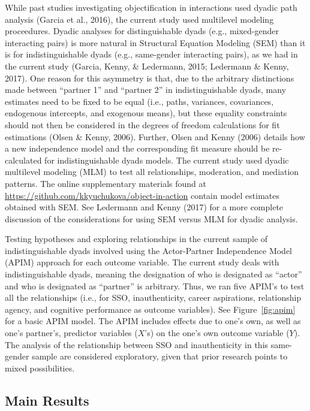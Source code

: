 \documentclass[man]{apa6}
\begin{document}
While past studies investigating objectification in interactions used
dyadic path analysis (Garcia et al., 2016), the current study used
multilevel modeling proceedures. Dyadic analyses for distinguishable
dyads (e.g., mixed-gender interacting pairs) is more natural in
Structural Equation Modeling (SEM) than it is for indistinguishable
dyads (e.g., same-gender interacting pairs), as we had in the current
study (Garcia, Kenny, \& Ledermann, 2015; Ledermann \& Kenny, 2017). One
reason for this asymmetry is that, due to the arbitrary distinctions
made between \enquote{partner 1} and \enquote{partner 2} in
indistinguishable dyads, many estimates need to be fixed to be equal
(i.e., paths, variances, covariances, endogenous intercepts, and
exogenous means), but these equality constraints should not then be
considered in the degrees of freedom calculations for fit estimations
(Olsen \& Kenny, 2006). Further, Olsen and Kenny (2006) details how a
new independence model and the corresponding fit measure should be
re-calculated for indistinguishable dyads models. The current study used
dyadic multilevel modeling (MLM) to test all relationships, moderation,
and mediation patterns. The online supplementary materials found at
\url{https://github.com/kkyuchukova/object-in-action} contain model
estimates obtained with SEM. See Ledermann and Kenny (2017) for a more
complete discussion of the considerations for using SEM versus MLM for
dyadic analysis.

Testing hypotheses and exploring relationships in the current sample of
indistinguishable dyads involved using the Actor-Partner Independence
Model (APIM) approach for each outcome variable. The current study deals
with indistinguishable dyads, meaning the designation of who is
designated as \enquote{actor} and who is designated as \enquote{partner}
is arbitrary. Thus, we ran five APIM's to test all the relationships
(i.e., for SSO, inauthenticity, career aspirations, relationship agency,
and cognitive performance as outcome variables). See
Figure~\ref{fig:apim} for a basic APIM model. The APIM includes effects
due to one's own, as well as one's partner's, predictor variables
(\(X\)'s) on the one's own outcome variable (\(Y\)). The analysis of the
relationship between SSO and inauthenticity in this same-gender sample
are considered exploratory, given that prior research points to mixed
possibilities.

\subsection{Main Results}\label{main-results}
\end{document}
